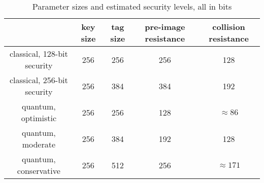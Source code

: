 \documentclass{article}
\begin{document}
\begin{table}[h]
    \begin{center}
        \begin{tabular}{c|c|c|c|c}
            & key size & tag size & pre-image resistance & collision resistance \\
            \hline
            classical, 128-bit security & 256 & 256 & 256 & 128 \\
            classical, 256-bit security & 256 & 384 & 384 & 192 \\
            quantum, optimistic & 256 & 256 & 128 & $\approx 86$\\
            quantum, moderate & 256 & 384 & 192 & 128\\
            quantum, conservative & 256 & 512 & 256 & $\approx 171$\\
        \end{tabular}
    \end{center}
    \caption{Parameter sizes and estimated security levels, all in bits}
\end{table}



\end{document}
